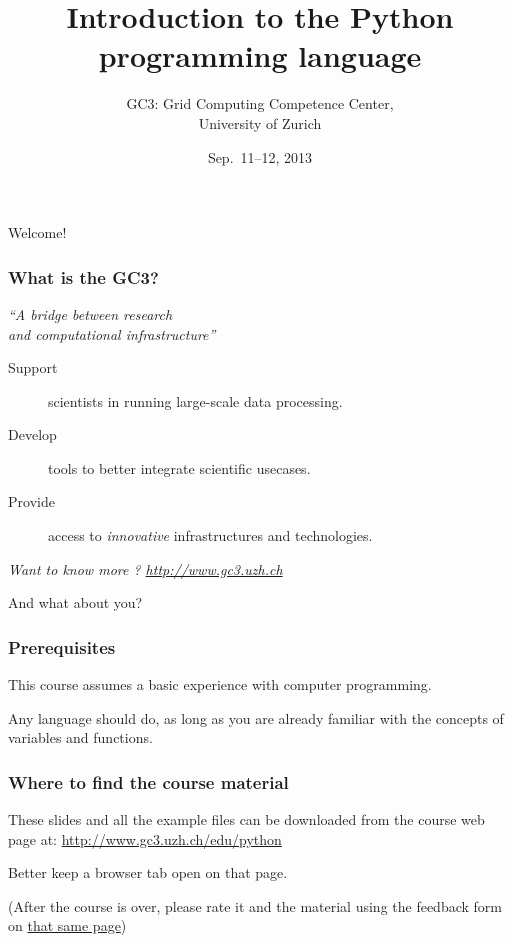 \documentclass[english,serif,mathserif,xcolor=pdftex,dvipsnames,table]{beamer}
\title[Introduction]{%
  Introduction to the Python programming language
}
\author[GC3]{%
  GC3: Grid Computing Competence Center, \\
  University of Zurich
}
\date{Sep.~11--12, 2013}
\begin{document}
\maketitle

\begin{frame}
  \begin{center}
    {\Huge Welcome!}
  \end{center}
\end{frame}


\begin{frame}
  \frametitle{What is the GC3?}

  \begin{center}
    {\em ``A bridge between research \\ and computational infrastructure''}

    \+
    \begin{description}
    \item[Support] scientists in running large-scale data processing.
    \item[Develop] tools to better integrate scientific usecases.
    \item[Provide] access to {\em innovative} infrastructures and technologies.
    \end{description}

    \+
    {\em \small{Want to know more ? }\url{http://www.gc3.uzh.ch}}
  \end{center}
\end{frame}


\begin{frame}
  \begin{center}
    {\Huge And what about you?}
  \end{center}
\end{frame}


\begin{frame}
  \frametitle{Prerequisites}
  This course assumes a basic experience with computer programming.

  \+
  Any language should do, as long as you are already familiar with
  the concepts of variables and functions.
\end{frame}


\begin{frame}
  \frametitle{Where to find the course material}

  These slides and all the example files can be downloaded from the
  course web page at:
  {\small\url{http://www.gc3.uzh.ch/edu/python}}

  \+
  Better keep a browser tab open on that page.

  \+
  (After the course is over, please rate it and the material using
  the feedback form on \href{http://www.gc3.uzh.ch/edu/python}{that
    same page})
\end{frame}
\end{document}
